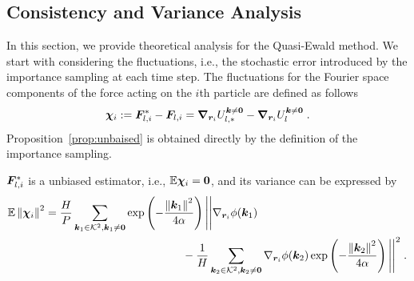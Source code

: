 \subsection{Consistency and Variance Analysis}
In this section, we provide theoretical analysis for the Quasi-Ewald method. We start with considering the fluctuations, i.e., the stochastic error introduced by the importance sampling at each time step.
The fluctuations for the Fourier space components of   the force acting on the $i$th particle are defined as follows 
\begin{equation}\label{eq::xichi}
    \boldsymbol{\chi}_{i} :=\bm{F}_{l,i}^*-\bm{F}_{l,i}=\boldsymbol{\nabla}_{\boldsymbol{r}_i} U_{l,\ast}^{\bm{k}\neq \bm{0}}-\boldsymbol{\nabla}_{\boldsymbol{r}_i} U_{l}^{\bm{k}\neq \bm{0}}\;.
\end{equation}
Proposition~\ref{prop:unbaised} is obtained directly by the definition of the importance sampling.
\begin{prop}\label{prop:unbaised}
	  $\bm{F}_{l,i}^*$ is a  unbiased estimator, i.e.,  $\mathbb{E} \boldsymbol{\chi}_{i} = \bm 0$, and its variance  can be expressed by
\begin{align*}
		\mathbb{E}\left\lVert\boldsymbol{\chi}_{i}\right\rVert^2&=\frac{H}{P}\sum_{\bm{k}_1\in\mathcal{K}^2, \bm{k}_1\neq \bm{0}}\exp\left(-\frac{\left\lVert\bm{k}_1\right\rVert^2}{4\alpha}\right)\Bigg|\Bigg|\nabla_{\bm{r}_i}\phi(\bm{k}_1)\\
        &~~~~~~~~~~~~~~~~~~~~~~~~~~~~~~~~~~~~~-\frac{1}{H} \sum_{\bm{k}_2\in\mathcal{K}^2, \bm{k}_2\neq \bm{0}}\nabla_{\bm{r}_i}\phi(\bm{k}_2)\exp\left(-\frac{\left\lVert\bm{k}_2\right\rVert^2}{4\alpha}\right)\Bigg|\Bigg|^2\;.
\end{align*}
\end{prop}

